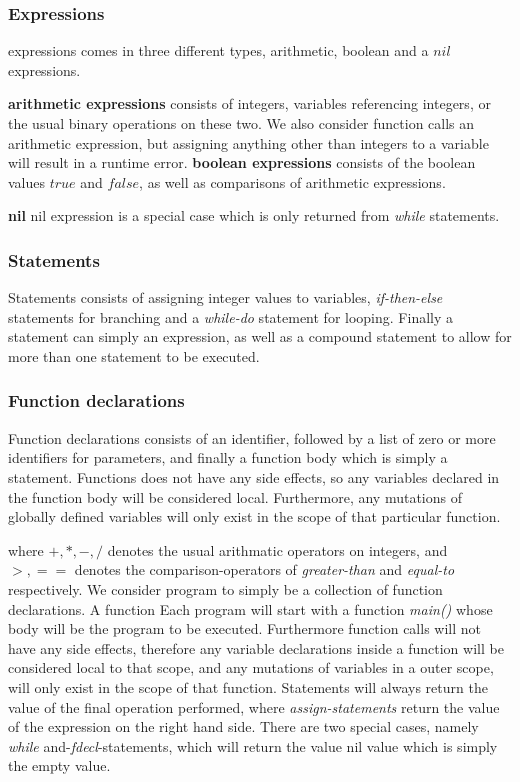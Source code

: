 \subsubsection{Expressions}
expressions comes in three different types, arithmetic, boolean and a $nil$ expressions.

\textbf{arithmetic expressions} consists of integers, variables referencing integers, or the usual binary operations on these two. We also consider function calls an arithmetic expression, but assigning anything other than integers to a variable will result in a runtime error. 
\textbf{boolean expressions} consists of the boolean values $true$ and $false$, as well as comparisons of arithmetic expressions. 

\textbf{nil}
  nil expression is a special case which is only returned from \emph{while} statements. 

\subsubsection{Statements}
Statements consists of assigning integer values to variables, \emph{if-then-else} statements for branching and a \emph{while-do} statement for looping. Finally a statement can simply an expression, as well as a compound statement to allow for more than one statement to be executed.

\subsubsection{Function declarations}

Function declarations consists of an identifier, followed by a list of zero or more identifiers for parameters, and finally a function body which is simply a statement. Functions does not have any side effects, so any variables declared in the function body will be considered local. Furthermore, any mutations of globally defined variables will only exist in the scope of that particular function.

\iffalse

where $+, *, -, /$ denotes the usual arithmatic operators on integers, and $>, ==$ denotes the comparison-operators of \emph{greater-than} and \emph{equal-to} respectively. We consider program to simply be a collection of function declarations. A function  Each program will start with a function \emph{main()} whose body will be the program to be executed. Furthermore function calls will not have any side effects, therefore any variable declarations inside a function will be considered local to that scope, and any mutations of variables in a outer scope, will only exist in the scope of that function. Statements will always return the value of the final operation performed, where \emph{assign-statements} return the value of the expression on the right hand side. There are two special cases, namely \emph{while} and-\emph{fdecl}-statements, which will return the value nil value which is simply the empty value. 

